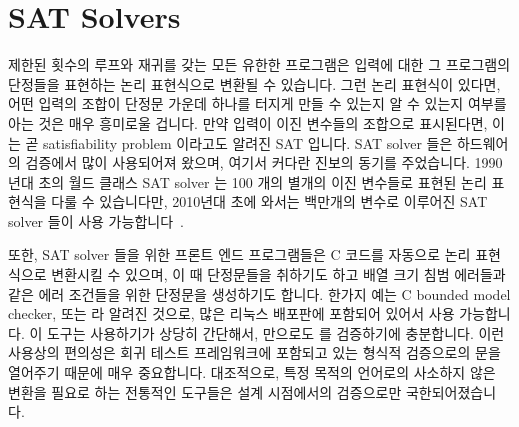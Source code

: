 
\section{SAT Solvers}
\label{sec:formal:SAT Solvers}

제한된 횟수의 루프와 재귀를 갖는 모든 유한한 프로그램은 입력에 대한 그
프로그램의 단정들을 표현하는 논리 표현식으로 변환될 수 있습니다.
그런 논리 표현식이 있다면, 어떤 입력의 조합이 단정문 가운데 하나를 터지게 만들
수 있는지 알 수 있는지 여부를 아는 것은 매우 흥미로울 겁니다.
만약 입력이 이진 변수들의 조합으로 표시된다면, 이는 곧 satisfiability problem
이라고도 알려진 SAT 입니다.
SAT solver 들은 하드웨어의 검증에서 많이 사용되어져 왔으며, 여기서 커다란
진보의 동기를 주었습니다.
1990년대 초의 월드 클래스 SAT solver 는 100 개의 별개의 이진 변수들로 표현된
논리 표현식을 다룰 수 있습니다만, 2010년대 초에 와서는 백만개의 변수로 이루어진
SAT solver 들이 사용 가능합니다~\cite{Kroening:2008:DPA:1391237}.

또한, SAT solver 들을 위한 프론트 엔드 프로그램들은 C 코드를 자동으로 논리
표현식으로 변환시킬 수 있으며, 이 때 단정문들을 취하기도 하고 배열 크기 침범
에러들과 같은 에러 조건들을 위한 단정문을 생성하기도 합니다.
한가지 예는 C bounded model checker, 또는  라 알려진 것으로, 많은
리눅스 배포판에 포함되어 있어서 사용 가능합니다.
이 도구는 사용하기가 상당히 간단해서,  만으로도 
를 검증하기에 충분합니다.
이런 사용상의 편의성은 회귀 테스트 프레임워크에 포함되고 있는 형식적 검증으로의
문을 열어주기 때문에 매우 중요합니다.
대조적으로, 특정 목적의 언어로의 사소하지 않은 변환을 필요로 하는 전통적인
도구들은 설계 시점에서의 검증으로만 국한되어졌습니다.
\iffalse

